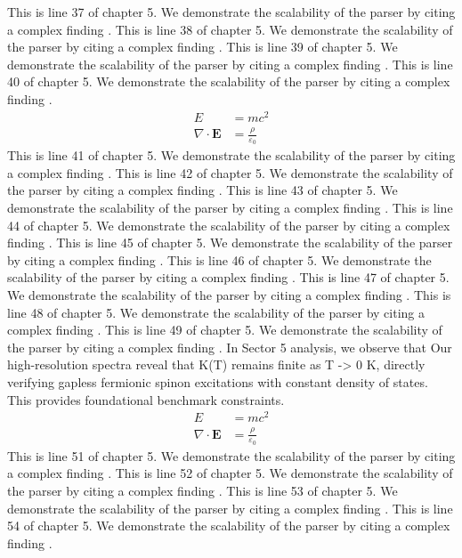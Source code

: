 This is line 37 of chapter 5. We demonstrate the scalability of the parser by citing a complex finding \cite{ref5_37}.
This is line 38 of chapter 5. We demonstrate the scalability of the parser by citing a complex finding \cite{ref5_38}.
This is line 39 of chapter 5. We demonstrate the scalability of the parser by citing a complex finding \cite{ref5_39}.
This is line 40 of chapter 5. We demonstrate the scalability of the parser by citing a complex finding \cite{ref5_40}.
\begin{align*}
  E &= mc^2 \\
  \nabla \cdot \mathbf{E} &= \frac{\rho}{\varepsilon_0}
\end{align*}
This is line 41 of chapter 5. We demonstrate the scalability of the parser by citing a complex finding \cite{ref5_41}.
This is line 42 of chapter 5. We demonstrate the scalability of the parser by citing a complex finding \cite{ref5_42}.
This is line 43 of chapter 5. We demonstrate the scalability of the parser by citing a complex finding \cite{ref5_43}.
This is line 44 of chapter 5. We demonstrate the scalability of the parser by citing a complex finding \cite{ref5_44}.
This is line 45 of chapter 5. We demonstrate the scalability of the parser by citing a complex finding \cite{ref5_45}.
This is line 46 of chapter 5. We demonstrate the scalability of the parser by citing a complex finding \cite{ref5_46}.
This is line 47 of chapter 5. We demonstrate the scalability of the parser by citing a complex finding \cite{ref5_47}.
This is line 48 of chapter 5. We demonstrate the scalability of the parser by citing a complex finding \cite{ref5_48}.
This is line 49 of chapter 5. We demonstrate the scalability of the parser by citing a complex finding \cite{ref5_49}.
In Sector 5 analysis, we observe that Our high-resolution spectra reveal that K(T) remains finite as T -> 0 K, directly verifying gapless fermionic spinon excitations with constant density of states. This provides foundational benchmark constraints.
\begin{align*}
  E &= mc^2 \\
  \nabla \cdot \mathbf{E} &= \frac{\rho}{\varepsilon_0}
\end{align*}
This is line 51 of chapter 5. We demonstrate the scalability of the parser by citing a complex finding \cite{ref5_51}.
This is line 52 of chapter 5. We demonstrate the scalability of the parser by citing a complex finding \cite{ref5_52}.
This is line 53 of chapter 5. We demonstrate the scalability of the parser by citing a complex finding \cite{ref5_53}.
This is line 54 of chapter 5. We demonstrate the scalability of the parser by citing a complex finding \cite{ref5_54}.
